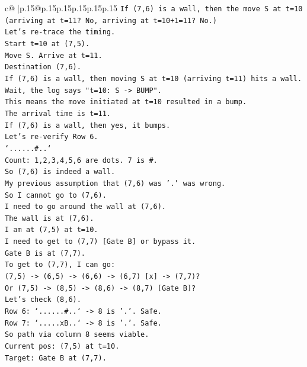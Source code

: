 \documentclass{article}
\begin{document}
{\begin{supertabular}{c@{$\;$}|p{.15\linewidth}@{}p{.15\linewidth}p{.15\linewidth}p{.15\linewidth}p{.15\linewidth}p{.15\linewidth}}
{{{\texttt{If (7,6) is a wall, then the move S at t=10 (arriving at t=11? No, arriving at t=10+1=11? No.)} \\
\texttt{Let's re{-}trace the timing.} \\
\texttt{Start t=10 at (7,5).} \\
\texttt{Move S. Arrive at t=11.} \\
\texttt{Destination (7,6).} \\
\texttt{If (7,6) is a wall, then moving S at t=10 (arriving t=11) hits a wall.} \\
\texttt{Wait, the log says "t=10: S {-}> BUMP".} \\
\texttt{This means the move initiated at t=10 resulted in a bump.} \\
\texttt{The arrival time is t=11.} \\
\texttt{If (7,6) is a wall, then yes, it bumps.} \\
\texttt{Let's re{-}verify Row 6.} \\
\texttt{`......\#..`} \\
\texttt{Count: 1,2,3,4,5,6 are dots. 7 is \#.} \\
\texttt{So (7,6) is indeed a wall.} \\
\texttt{My previous assumption that (7,6) was '.' was wrong.} \\
\texttt{So I cannot go to (7,6).} \\
\texttt{I need to go around the wall at (7,6).} \\
\texttt{The wall is at (7,6).} \\
\texttt{I am at (7,5) at t=10.} \\
\texttt{I need to get to (7,7) {[}Gate B{]} or bypass it.} \\
\texttt{Gate B is at (7,7).} \\
\texttt{To get to (7,7), I can go:} \\
\texttt{(7,5) {-}> (6,5) {-}> (6,6) {-}> (6,7) {[}x{]} {-}> (7,7)?} \\
\texttt{Or (7,5) {-}> (8,5) {-}> (8,6) {-}> (8,7) {[}Gate B{]}?} \\
\texttt{Let's check (8,6).} \\
\texttt{Row 6: `......\#..` {-}> 8 is '.'. Safe.} \\
\texttt{Row 7: `.....xB..` {-}> 8 is '.'. Safe.} \\
\texttt{So path via column 8 seems viable.} \\
\texttt{Current pos: (7,5) at t=10.} \\
\texttt{Target: Gate B at (7,7).} \\
}}}
\end{supertabular}}
\end{document}
